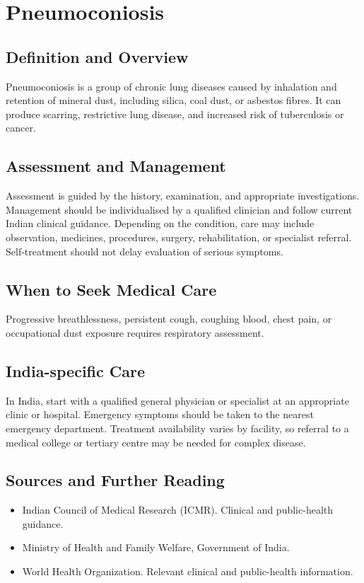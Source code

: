 \chapter{Pneumoconiosis}

\section*{Definition and Overview}
Pneumoconiosis is a group of chronic lung diseases caused by inhalation and retention of mineral dust, including silica, coal dust, or asbestos fibres. It can produce scarring, restrictive lung disease, and increased risk of tuberculosis or cancer.

\section*{Assessment and Management}
Assessment is guided by the history, examination, and appropriate investigations. Management should be individualised by a qualified clinician and follow current Indian clinical guidance. Depending on the condition, care may include observation, medicines, procedures, surgery, rehabilitation, or specialist referral. Self-treatment should not delay evaluation of serious symptoms.

\section*{When to Seek Medical Care}
Progressive breathlessness, persistent cough, coughing blood, chest pain, or occupational dust exposure requires respiratory assessment.

\section*{India-specific Care}
In India, start with a qualified general physician or specialist at an appropriate clinic or hospital. Emergency symptoms should be taken to the nearest emergency department. Treatment availability varies by facility, so referral to a medical college or tertiary centre may be needed for complex disease.

\section*{Sources and Further Reading}
\begin{itemize}
    \item Indian Council of Medical Research (ICMR). Clinical and public-health guidance.
    \item Ministry of Health and Family Welfare, Government of India.
    \item World Health Organization. Relevant clinical and public-health information.
\end{itemize}


